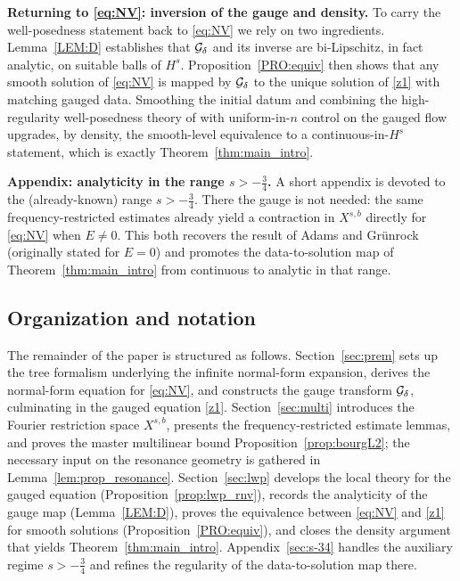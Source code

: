 \medskip

\textbf{Returning to \eqref{eq:NV}: inversion of the gauge and density.}
To carry the well-posedness statement back to \eqref{eq:NV} we rely on two ingredients. Lemma~\ref{LEM:D} establishes that $\mathcal{G}_\delta$ and its inverse are bi-Lipschitz, in fact analytic, on suitable balls of $H^s$. Proposition~\ref{PRO:equiv} then shows that any smooth solution of \eqref{eq:NV} is mapped by $\mathcal{G}_\delta$ to the unique solution of \eqref{z1} with matching gauged data. Smoothing the initial datum and combining the high-regularity well-posedness theory of \cite{angelopolous,kazeykinamunoz1,kazeykinamunoz2} with uniform-in-$n$ control on the gauged flow upgrades, by density, the smooth-level equivalence to a continuous-in-$H^s$ statement, which is exactly Theorem~\ref{thm:main_intro}.

\medskip

\textbf{Appendix: analyticity in the range $s>-\tfrac34$.}
A short appendix is devoted to the (already-known) range $s>-\tfrac34$. There the gauge is not needed: the same frequency-restricted estimates already yield a contraction in $X^{s,b}$ directly for \eqref{eq:NV} when $E\neq 0$. This both recovers the result of Adams and Gr\"unrock \cite{adamsgrunrock} (originally stated for $E=0$) and promotes the data-to-solution map of Theorem~\ref{thm:main_intro} from continuous to analytic in that range.

\medskip


\subsection{Organization and notation}

The remainder of the paper is structured as follows. Section~\ref{sec:prem} sets up the tree formalism underlying the infinite normal-form expansion, derives the normal-form equation for \eqref{eq:NV}, and constructs the gauge transform $\mathcal{G}_\delta$, culminating in the gauged equation \eqref{z1}. Section~\ref{sec:multi} introduces the Fourier restriction space $X^{s,b}$, presents the frequency-restricted estimate lemmas, and proves the master multilinear bound Proposition~\ref{prop:bourgL2}; the necessary input on the resonance geometry is gathered in Lemma~\ref{lem:prop_resonance}. Section~\ref{sec:lwp} develops the local theory for the gauged equation (Proposition~\ref{prop:lwp_rnv}), records the analyticity of the gauge map (Lemma~\ref{LEM:D}), proves the equivalence between \eqref{eq:NV} and \eqref{z1} for smooth solutions (Proposition~\ref{PRO:equiv}), and closes the density argument that yields Theorem~\ref{thm:main_intro}. Appendix~\ref{sec:s-34} handles the auxiliary regime $s>-\tfrac34$ and refines the regularity of the data-to-solution map there.

